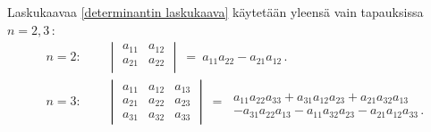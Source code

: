 Laskukaavaa \eqref{determinantin laskukaava} käytetään yleensä vain tapauksissa $n=2,3\,$:
\begin{align*}
&n=2: \qquad \begin{vmatrix}
a_{11} & a_{12} \\
a_{21} & a_{22} \\
\end{vmatrix}\ =\ a_{11}a_{22}-a_{21}a_{12}\,. \\[2mm]
&n=3: \qquad \begin{vmatrix}
a_{11} & a_{12} & a_{13} \\
a_{21} & a_{22} & a_{23} \\
a_{31} & a_{32} & a_{33}
\end{vmatrix}\
=\ \begin{array}{l} \\ a_{11}a_{22}a_{33}+a_{31}a_{12}a_{23}+a_{21}a_{32}a_{13} \\
                       -a_{31}a_{22}a_{13}-a_{11}a_{32}a_{23}-a_{21}a_{12}a_{33}\,.
\end{array}
\end{align*}

